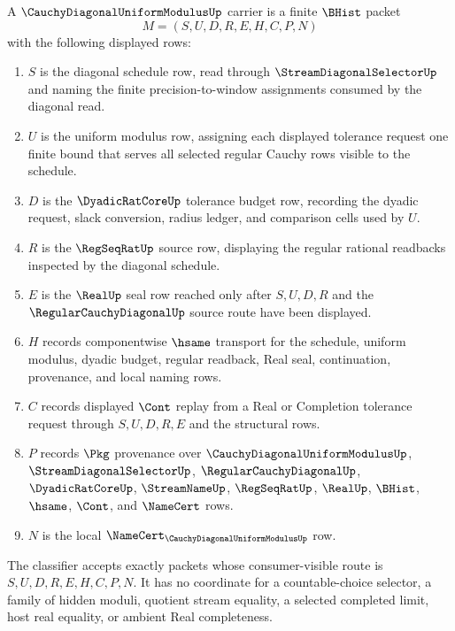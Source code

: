 \begin{definition}
\label{def:cauchy-diagonal-uniform-modulus-carrier}
A $\CauchyDiagonalUniformModulusUp$ carrier is a finite $\BHist$ packet
$$
M=(S,U,D,R,E,H,C,P,N)
$$
with the following displayed rows:
\begin{enumerate}
\item $S$ is the diagonal schedule row, read through $\StreamDiagonalSelectorUp$ and naming the finite precision-to-window assignments consumed by the diagonal read.
\item $U$ is the uniform modulus row, assigning each displayed tolerance request one finite bound that serves all selected regular Cauchy rows visible to the schedule.
\item $D$ is the $\DyadicRatCoreUp$ tolerance budget row, recording the dyadic request, slack conversion, radius ledger, and comparison cells used by $U$.
\item $R$ is the $\RegSeqRatUp$ source row, displaying the regular rational readbacks inspected by the diagonal schedule.
\item $E$ is the $\RealUp$ seal row reached only after $S,U,D,R$ and the $\RegularCauchyDiagonalUp$ source route have been displayed.
\item $H$ records componentwise $\hsame$ transport for the schedule, uniform modulus, dyadic budget, regular readback, Real seal, continuation, provenance, and local naming rows.
\item $C$ records displayed $\Cont$ replay from a Real or Completion tolerance request through $S,U,D,R,E$ and the structural rows.
\item $P$ records $\Pkg$ provenance over $\CauchyDiagonalUniformModulusUp$, $\StreamDiagonalSelectorUp$, $\RegularCauchyDiagonalUp$, $\DyadicRatCoreUp$, $\StreamNameUp$, $\RegSeqRatUp$, $\RealUp$, $\BHist$, $\hsame$, $\Cont$, and $\NameCert$ rows.
\item $N$ is the local $\NameCert_{\CauchyDiagonalUniformModulusUp}$ row.
\end{enumerate}
The classifier accepts exactly packets whose consumer-visible route is $S,U,D,R,E,H,C,P,N$. It has no coordinate for a countable-choice selector, a family of hidden moduli, quotient stream equality, a selected completed limit, host real equality, or ambient Real completeness.
\end{definition}

